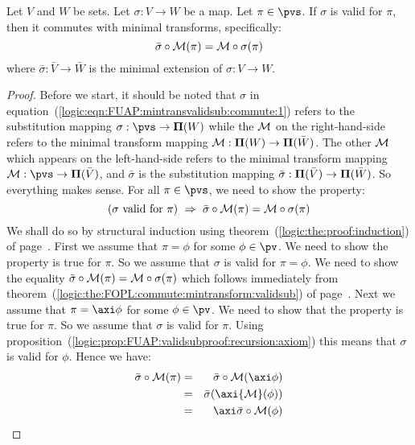 \begin{theorem}\label{logic:the:FUAP:mintransvalidsub:commute}
Let $V$ and $W$ be sets. Let $\sigma:V\to W$ be a map. Let
$\pi\in\pvs$. If $\sigma$ is valid for $\pi$, then it commutes with
minimal transforms, specifically:
    \begin{equation}\label{logic:eqn:FUAP:mintransvalidsub:commute:1}
    \bar{\sigma}\circ{\cal M}(\pi)={\cal M}\circ\sigma(\pi)
    \end{equation}
where $\bar{\sigma}:\bar{V}\to\bar{W}$ is the minimal extension of
$\sigma: V\to W$.
\end{theorem}
\begin{proof}
Before we start, it should be noted that $\sigma$ in
equation~(\ref{logic:eqn:FUAP:mintransvalidsub:commute:1}) refers to
the substitution mapping $\sigma:\pvs\to{\bf\Pi}(W)$ while the
${\cal M}$ on the right-hand-side refers to the minimal transform
mapping ${\cal M}:{\bf\Pi}(W)\to{\bf\Pi}(\bar{W})$. The other ${\cal
M}$ which appears on the left-hand-side refers to the minimal
transform mapping ${\cal M}:\pvs\to{\bf\Pi}(\bar{V})$, and
$\bar{\sigma}$ is the substitution mapping $\bar{\sigma}:{\bf
\Pi}(\bar{V})\to{\bf\Pi}(\bar{W})$. So everything makes sense. For
all $\pi\in\pvs$, we need to show the property:
    \[
    (\mbox{$\sigma$ valid for $\pi$})\ \Rightarrow\
    \bar{\sigma}\circ{\cal M}(\pi)={\cal M}\circ\sigma(\pi)
    \]
We shall do so by structural induction using
theorem~(\ref{logic:the:proof:induction}) of
page~\pageref{logic:the:proof:induction}. First we assume that
$\pi=\phi$ for some $\phi\in\pv$. We need to show the property is
true for $\pi$. So we assume that $\sigma$ is valid for $\pi=\phi$.
We need to show the equality $\bar{\sigma}\circ{\cal M}(\pi)={\cal
M}\circ\sigma(\pi)$ which follows immediately from
theorem~(\ref{logic:the:FOPL:commute:mintransform:validsub}) of
page~\pageref{logic:the:FOPL:commute:mintransform:validsub}. Next we
assume that $\pi=\axi\phi$ for some $\phi\in\pv$. We need to show
that the property is true for $\pi$. So we assume that $\sigma$ is
valid for $\pi$. Using
proposition~(\ref{logic:prop:FUAP:validsubproof:recursion:axiom})
this means that $\sigma$ is valid for $\phi$. Hence we have:
    \begin{eqnarray*}
    \bar{\sigma}\circ{\cal M}(\pi)&=&\bar{\sigma}\circ{\cal
    M}(\axi\phi)\\
    &=&\bar{\sigma}(\axi{\cal M}(\phi))\\
    &=&\axi\bar{\sigma}\circ{\cal M}(\phi)\\

\end{eqnarray*}
\end{proof}
